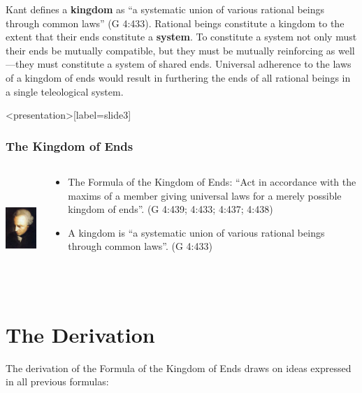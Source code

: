 Kant defines a \textbf{kingdom} as ``a systematic union of various rational beings through common laws'' (G 4:433). Rational beings constitute a kingdom to the extent that their ends constitute a \textbf{system}. To constitute a system not only must their ends be mutually compatible, but they must be mutually reinforcing as well---they must constitute a system of shared ends. Universal adherence to the laws of a kingdom of ends would result in furthering the ends of all rational beings in a single teleological system. \change

\begin{frame}<presentation>[label=slide3]
    \frametitle{The Kingdom of Ends}
        \begin{columns}
            \begin{column}{3cm}
                \includegraphics[height=4cm]{../../graphics/kant.jpg}
            \end{column}
            \begin{column}{7cm}
                \begin{itemize}
                    \item \alert{The Formula of the Kingdom of Ends}: ``Act in accordance with the maxims of a member giving universal laws for a merely possible kingdom of ends''. (G 4:439; 4:433; 4:437; 4:438)
                    \item A \alert{kingdom} is ``a systematic union of various rational beings through common laws''. (G 4:433)
                \end{itemize}
            \end{column}
        \end{columns}
\end{frame}

\section{The Derivation}

The derivation of the Formula of the Kingdom of Ends draws on ideas expressed in all previous formulas:

